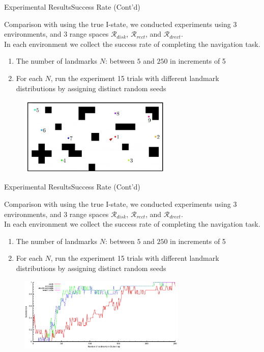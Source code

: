 \documentclass[10pt]{beamer}
\begin{document}
\begin{frame}{Experimental Results}{Success Rate (Cont'd)}
 \small{Comparison with using the true I-state, we conducted experiments using 3
 environments, and 3 range spaces $\mathcal{R}_{disk}$, $\mathcal{R}_{rect}$,
 and  $\mathcal{R}_{drect}$. \\
 In each environment we collect the success rate of completing the navigation
 task. 
 \begin{enumerate}
 \item The number of landmarks $N$: between $5$ and $250$ in increments of 5
 \item For each $N$, run the experiment 15 trials with different landmark
   distributions by assigning distinct random seeds
 \end{enumerate}
}
\begin{figure}
  \centering
  \includegraphics[width=0.65\textwidth]{figs/clutter}
\end{figure}
\end{frame}

\begin{frame}{Experimental Results}{Success Rate (Cont'd)}
 \small{Comparison with using the true I-state, we conducted experiments using 3
 environments, and 3 range spaces $\mathcal{R}_{disk}$, $\mathcal{R}_{rect}$,
 and  $\mathcal{R}_{drect}$. \\
 In each environment we collect the success rate of completing the navigation
 task. 
 \begin{enumerate}
 \item The number of landmarks $N$: between $5$ and $250$ in increments of 5
 \item For each $N$, run the experiment 15 trials with different landmark
   distributions by assigning distinct random seeds
 \end{enumerate}
}
\begin{figure}
  \centering
  \includegraphics[width=0.71\textwidth]{figs/exp_num_clutter}
\end{figure}
\end{frame}
\end{document}
